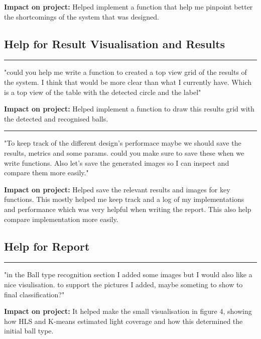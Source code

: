 \documentclass[12pt,a4paper]{article}
\newenvironment{promptentry}{%
    \par\Needspace{7\baselineskip}\addvspace{1.2em}
    \hrule
    \nobreak\vspace{0.5em}
}{\par\addvspace{0.5em}}
\newenvironment{aiprompt}{%
    \begin{list}{}{%
        \setlength{\leftmargin}{1em}%
        \setlength{\rightmargin}{1em}%
        \setlength{\topsep}{0.3em}%
        \setlength{\parsep}{0pt}%
    }%
    \item\relax
}{\end{list}}
\begin{document}
\textbf{Impact on project:} Helped implement a function that help me pinpoint better the shortcomings of the system
that was designed.

\subsection{Help for Result Visualisation and Results}

\begin{promptentry}

\begin{aiprompt}
"could you help me write a function to created a top view grid of the results of the system.
I think that would be more clear than what I currently have. Which is a top view of the table 
with the detected circle and the label"
\end{aiprompt}

\textbf{Impact on project:} Helped implement a function to draw this results grid with the detected and recognised balls.

\end{promptentry}
\FloatBarrier

\begin{promptentry}
\begin{aiprompt}
"To keep track of the different design's performace maybe we should save the results, metrics and some params.
could you make sure to save these when we write functions. Also let's save the generated images so I can inspect and compare
them more easily."
\end{aiprompt}

\textbf{Impact on project:} Helped save the relevant results and images for key functions.
This mostly helped me keep track and a log of my implementations and performance which was very helpful
when writing the report. This also help compare implementation more easily.
\end{promptentry}
\FloatBarrier

\subsection{Help for Report}

\begin{promptentry}
\begin{aiprompt}
"in the Ball type recognition section I added some images but I would also like a nice visulisation. 
to support the pictures I added, maybe someting to show to final classification?"
\end{aiprompt}

\textbf{Impact on project:} It helped make the small visualisation in figure 4, 
showing how HLS and K-means estimated light coverage and how this 
determined the initial ball type.

\end{promptentry}
\FloatBarrier
\end{document}
